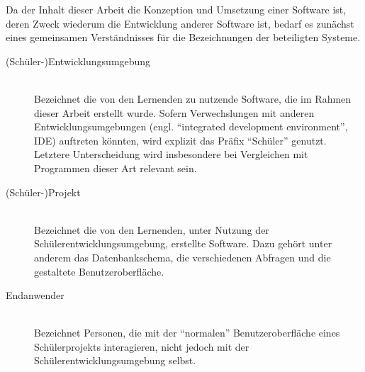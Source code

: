 Da der Inhalt dieser Arbeit die Konzeption und Umsetzung einer Software ist, deren Zweck wiederum die Entwicklung anderer Software ist, bedarf es zunächst eines gemeinsamen Verständnisses für die Bezeichnungen der beteiligten Systeme.

\begin{description}
\item[(Schüler-)Entwicklungsumgebung] \hfill\\ 
  Bezeichnet die von den Lernenden zu nutzende Software, die im Rahmen dieser Arbeit erstellt wurde. Sofern Verwechslungen mit anderen Entwicklungsumgebungen (engl. ``integrated development environment'', IDE) auftreten könnten, wird explizit das Präfix ``Schüler'' genutzt. Letztere Unterscheidung wird insbesondere bei Vergleichen mit Programmen dieser Art relevant sein.
\item[(Schüler-)Projekt] \hfill\\
  Bezeichnet die von den Lernenden, unter Nutzung der Schülerentwicklungsumgebung, erstellte Software. Dazu gehört unter anderem das Datenbankschema, die verschiedenen Abfragen und die gestaltete Benutzeroberfläche.
\item[Endanwender] \hfill\\
  Bezeichnet Personen, die mit der ``normalen'' Benutzeroberfläche eines Schülerprojekts interagieren, nicht jedoch mit der Schülerentwicklungsumgebung selbst.
\end{description}
